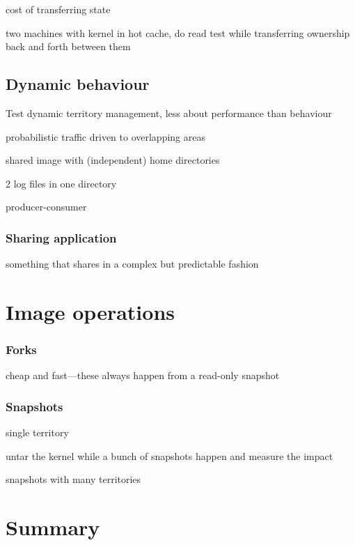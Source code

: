 cost of transferring state

two machines with kernel in hot cache, do read test while transferring ownership back and forth between them

\subsection{Dynamic behaviour}

Test dynamic territory management, less about performance than behaviour

probabilistic traffic driven to overlapping areas

shared image with (independent) home directories

2 log files in one directory

producer-consumer

\subsubsection{Sharing application}
something that shares in a complex but predictable fashion

\section{Image operations}

\subsubsection{Forks}

cheap and fast---these always happen from a read-only snapshot

\subsubsection{Snapshots}

single territory

untar the kernel while a bunch of snapshots happen and measure the impact

snapshots with many territories

\section{Summary}
